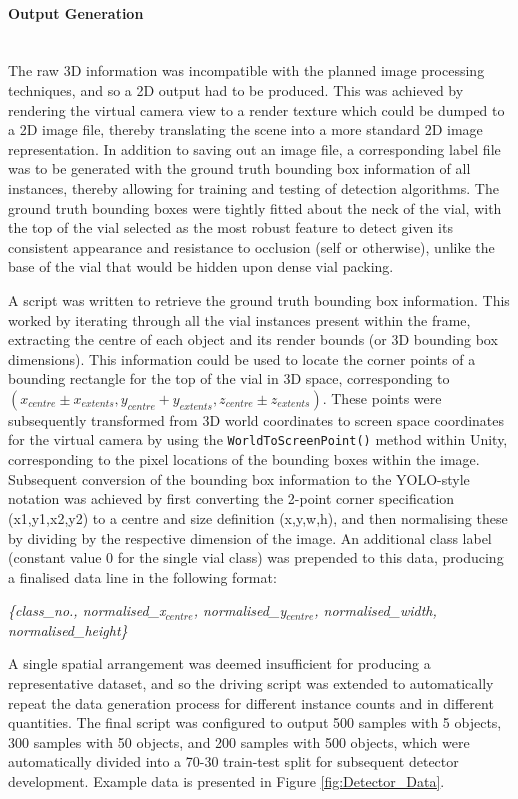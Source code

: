 \documentclass[10pt]{article}
\newcommand{\subsubsubsection}[1]{\paragraph{#1}\mbox{}\\}
\begin{document}
\subsubsubsection{Output Generation}
The raw 3D information was incompatible with the planned image processing techniques, and so a 2D output had to be produced. This was achieved by rendering the virtual camera view to a render texture which could be dumped to a 2D image file, thereby translating the scene into a more standard 2D image representation. In addition to saving out an image file, a corresponding label file was to be generated with the ground truth bounding box information of all instances, thereby allowing for training and testing of detection algorithms. The ground truth bounding boxes were tightly fitted about the neck of the vial, with the top of the vial selected as the most robust feature to detect given its consistent appearance and resistance to occlusion (self or otherwise), unlike the base of the vial that would be hidden upon dense vial packing.

A script was written to retrieve the ground truth bounding box information. This worked by iterating through all the vial instances present within the frame, extracting the centre of each object and its render bounds (or 3D bounding box dimensions). This information could be used to locate the corner points of a bounding rectangle for the top of the vial in 3D space, corresponding to $(x_{centre} \pm x_{extents}, y_{centre} + y_{extents}, z_{centre} \pm z_{extents})$. These points were subsequently transformed from 3D world coordinates to screen space coordinates for the virtual camera by using the \texttt{WorldToScreenPoint()} method within Unity, corresponding to the pixel locations of the bounding boxes within the image. Subsequent conversion of the bounding box information to the YOLO-style notation was achieved by first converting the 2-point corner specification (x1,y1,x2,y2) to a centre and size definition (x,y,w,h), and then normalising these by dividing by the respective dimension of the image. An additional class label (constant value 0 for the single vial class) was prepended to this data, producing a finalised data line in the following format:

\vspace{-0.2cm}
\textit{\{class\_no., normalised\_x$_{centre}$, normalised\_y$_{centre}$, normalised\_width, normalised\_height\}}

A single spatial arrangement was deemed insufficient for producing a representative dataset, and so the driving script was extended to automatically repeat the data generation process for different instance counts and in different quantities. The final script was configured to output 500 samples with 5 objects, 300 samples with 50 objects, and 200 samples with 500 objects, which were automatically divided into a 70-30 train-test split for subsequent detector development. Example data is presented in Figure \ref{fig:Detector_Data}.
\end{document}
